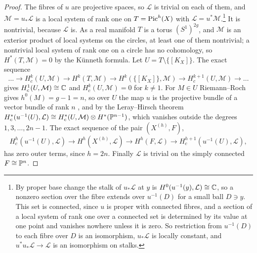 \begin{proof}
The fibres of $u$ are projective spaces, so $\mathcal{L}$ is trivial on each
of them, and $\mathcal{M}=u_{*}\mathcal{L}$ is a local system of rank one on
$T=\operatorname{Pic}^{h}(X)$ with $\mathcal{L}=u^{*}\mathcal{M}$.\footnote{By proper base
change the stalk of $u_{*}\mathcal{L}$ at $y$ is $H^{0}(u^{-1}(y),
\mathcal{L})\cong\mathbb{C}$, so a nonzero section over the fibre extends over
$u^{-1}(D)$ for a small ball $D\ni y$. This set is connected, since $u$ is
proper with connected fibres, and a section of a local system of rank one
over a connected set is determined by its value at one point and vanishes
nowhere unless it is zero. So restriction from $u^{-1}(D)$ to each fibre
over $D$ is an isomorphism, $u_{*}\mathcal{L}$ is locally constant, and
$u^{*}u_{*}\mathcal{L}\to\mathcal{L}$ is an isomorphism on stalks.} It is
nontrivial, because $\mathcal{L}$ is. As a real manifold $T$ is a torus
$(S^{1})^{2g}$, and $\mathcal{M}$ is an exterior product of local systems on
the circles, at least one of them nontrivial; a nontrivial local system of
rank one on a circle has no cohomology, so $H^{*}(T,\mathcal{M})=0$ by the
K\"unneth formula. Let $U=T\setminus\{[K_{X}]\}$. The exact sequence
\[
  \dots\to H^{k}_{c}(U,\mathcal{M})\to H^{k}(T,\mathcal{M})\to
  H^{k}(\{[K_{X}]\},\mathcal{M})\to H^{k+1}_{c}(U,\mathcal{M})\to\dots
\]
gives $H^{1}_{c}(U,\mathcal{M})\cong\mathbb{C}$ and $H^{k}_{c}(U,\mathcal{M})=0$ for
$k\ne1$. For $M\in U$ Riemann--Roch gives $h^{0}(M)=g-1=n$, so over $U$ the
map $u$ is the projective bundle of a vector bundle of rank $n$
\cite[Chapter~IV]{ACGH85}, and by the Leray--Hirsch theorem
$H^{*}_{c}(u^{-1}(U),\mathcal{L})\cong H^{*}_{c}(U,\mathcal{M})\otimes
H^{*}(\mathbb{P}^{n-1})$, which vanishes outside the degrees $1,3,\dots,2n-1$. The
exact sequence of the pair $(X^{(h)},F)$,
\[
  H^{h}_{c}(u^{-1}(U),\mathcal{L})\to H^{h}(X^{(h)},\mathcal{L})\to
  H^{h}(F,\mathcal{L})\to H^{h+1}_{c}(u^{-1}(U),\mathcal{L}),
\]
has zero outer terms, since $h=2n$. Finally $\mathcal{L}$ is trivial on the
simply connected $F\cong\mathbb{P}^{n}$.
\end{proof}


